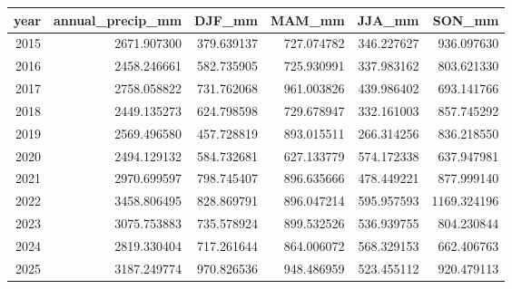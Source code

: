 \begin{tabular}{rrrrrr}
\toprule
year & annual\_precip\_mm & DJF\_mm & MAM\_mm & JJA\_mm & SON\_mm \\
\midrule
2015 & 2671.907300 & 379.639137 & 727.074782 & 346.227627 & 936.097630 \\
2016 & 2458.246661 & 582.735905 & 725.930991 & 337.983162 & 803.621330 \\
2017 & 2758.058822 & 731.762068 & 961.003826 & 439.986402 & 693.141766 \\
2018 & 2449.135273 & 624.798598 & 729.678947 & 332.161003 & 857.745292 \\
2019 & 2569.496580 & 457.728819 & 893.015511 & 266.314256 & 836.218550 \\
2020 & 2494.129132 & 584.732681 & 627.133779 & 574.172338 & 637.947981 \\
2021 & 2970.699597 & 798.745407 & 896.635666 & 478.449221 & 877.999140 \\
2022 & 3458.806495 & 828.869791 & 896.047214 & 595.957593 & 1169.324196 \\
2023 & 3075.753883 & 735.578924 & 899.532526 & 536.939755 & 804.230844 \\
2024 & 2819.330404 & 717.261644 & 864.006072 & 568.329153 & 662.406763 \\
2025 & 3187.249774 & 970.826536 & 948.486959 & 523.455112 & 920.479113 \\
\bottomrule
\end{tabular}
